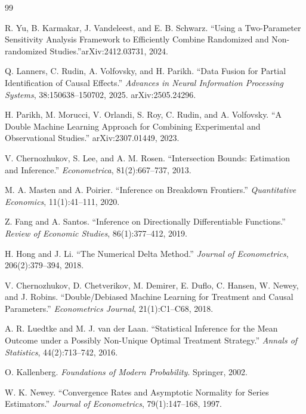 \documentclass{article}
\begin{document}
\begin{thebibliography}{99}

   R. Yu, B. Karmakar, J. Vandeleest, and E. B. Schwarz. \textquotedblleft Using a Two-Parameter Sensitivity Analysis Framework to Efficiently Combine Randomized and Non-randomized Studies.\textquotedblright arXiv:2412.03731, 2024.

   Q. Lanners, C. Rudin, A. Volfovsky, and H. Parikh. ``Data Fusion for Partial Identification of Causal Effects.'' \emph{Advances in Neural Information Processing Systems}, 38:150638--150702, 2025. arXiv:2505.24296.

   H. Parikh, M. Morucci, V. Orlandi, S. Roy, C. Rudin, and A. Volfovsky. ``A Double Machine Learning Approach for Combining Experimental and Observational Studies.'' arXiv:2307.01449, 2023.

   V. Chernozhukov, S. Lee, and A. M. Rosen. ``Intersection Bounds: Estimation and Inference.'' \emph{Econometrica}, 81(2):667--737, 2013.

   M. A. Masten and A. Poirier. ``Inference on Breakdown Frontiers.'' \emph{Quantitative Economics}, 11(1):41--111, 2020.

   Z. Fang and A. Santos. ``Inference on Directionally Differentiable Functions.'' \emph{Review of Economic Studies}, 86(1):377--412, 2019.

   H. Hong and J. Li. ``The Numerical Delta Method.'' \emph{Journal of Econometrics}, 206(2):379--394, 2018.

   V. Chernozhukov, D. Chetverikov, M. Demirer, E. Duflo, C. Hansen, W. Newey, and J. Robins. ``Double/Debiased Machine Learning for Treatment and Causal Parameters.'' \emph{Econometrics Journal}, 21(1):C1--C68, 2018.

   A. R. Luedtke and M. J. van der Laan. ``Statistical Inference for the Mean Outcome under a Possibly Non-Unique Optimal Treatment Strategy.'' \emph{Annals of Statistics}, 44(2):713--742, 2016.

   O. Kallenberg. \emph{Foundations of Modern Probability}. Springer, 2002.

   W. K. Newey. ``Convergence Rates and Asymptotic Normality for Series Estimators.'' \emph{Journal of Econometrics}, 79(1):147--168, 1997.

\end{thebibliography}
\end{document}

